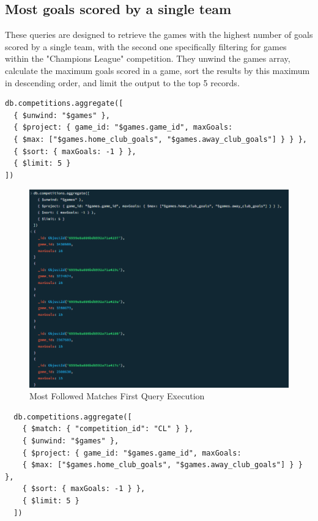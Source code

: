 \documentclass{Configuration_Files/PoliMi3i_thesis}
\begin{document}
\subsection{Most goals scored by a single team}
These queries are designed to retrieve the games with the highest number of goals scored by a single team, with the second one specifically filtering for games within the "Champions League" competition. They unwind the games array, calculate the maximum goals scored in a game, sort the results by this maximum in descending order, and limit the output to the top 5 records.
\begin{verbatim}
db.competitions.aggregate([
  { $unwind: "$games" },
  { $project: { game_id: "$games.game_id", maxGoals: 
  { $max: ["$games.home_club_goals", "$games.away_club_goals"] } } },
  { $sort: { maxGoals: -1 } },
  { $limit: 5 }
])
\end{verbatim}
\begin{figure}[htbp]
    \centering
    \includegraphics[scale=0.85]{Images/Queries/Competitions/most_goal_single_teams/mgst.png}
    \caption{Most Followed Matches First Query Execution}
\end{figure}

\begin{verbatim}
  db.competitions.aggregate([
    { $match: { "competition_id": "CL" } },
    { $unwind: "$games" },
    { $project: { game_id: "$games.game_id", maxGoals: 
    { $max: ["$games.home_club_goals", "$games.away_club_goals"] } } },
    { $sort: { maxGoals: -1 } },
    { $limit: 5 }
  ])
\end{verbatim}
\end{document}
